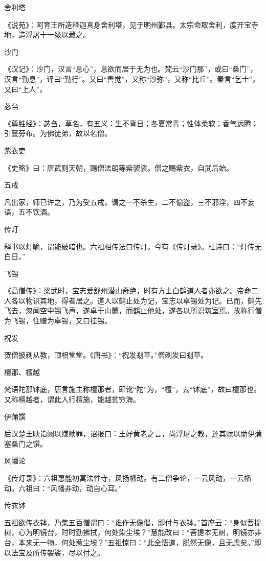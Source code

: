 \documentclass[a4paper,12pt,UTF8,twoside]{ctexbook}
\begin{document}
    舍利塔
    
    《说苑》：阿育王所造释迦真身舍利塔，见于明州鄞县。太宗命取舍利，度开宝寺地，造浮屠十一级以藏之。
    
    沙门
    
    《汉记》：沙门，汉言“息心”，息欲而居于无为也。梵云“沙门那”，或曰“桑门”，汉言“勤息”，译曰“勤行”。又曰“善觉”，又称“沙弥”，又称“比丘”。秦言“乞士”，又曰“上人”。
    
    苾刍
    
    《尊胜经》：苾刍，草名，有五义：生不背日；冬夏常青；性体柔软；香气远腾；引蔓旁布。为佛徒弟，故以名僧。
    
    紫衣吏
    
    《史略》曰：唐武则天朝，赐僧法朗等紫袈裟。僧之赐紫衣，自武后始。
    
    五戒
    
    凡出家，师已许之，乃为受五戒，谓之一不杀生，二不偷盗，三不邪淫，四不妄语，五不饮酒。
    
    传灯
    
    释书以灯喻，谓能破暗也。六祖相传法曰传灯。今有《传灯录》。杜诗曰：“灯传无白日。”
    
    飞锡
    
    《高僧传》：梁武时，宝志爱舒州潜山奇绝，时有方士白鹤道人者亦欲之。帝命二人各以物识其地，得者居之。道人以鹤止处为记，宝志以卓锡处为记。已而，鹤先飞去，忽闻空中锡飞声，遂卓于山麓，而鹤止他处，遂各以所识筑室焉。故称行僧为飞锡，住赠为卓锡，又曰挂锡。
    
    祝发
    
    贺僧披剃从教，顶相堂堂。《唐书》：“祝发刬草。”僧剃发曰刬草。
    
    檀那、檀越
    
    梵语陀那钵底，唐言施主称檀那者，即讹“陀”为，“檀”，去“钵底”，故曰檀那也。又称檀越者，谓此人行檀施，能越贫穷海。
    
    伊蒲馔
    
    后汉楚王映诣阙以缣赎罪，诏报曰：王好黄老之言，尚浮屠之教，还其赎以助伊蒲塞桑门之馔。
    
    风幡论
    
    《传灯录》：六祖惠能初寓法性寺，风扬幡动。有二僧争论，一云风动，一云幡动。六祖曰：“风幡非动，动自心耳。”
    
    传衣钵
    
    五祖欲传衣钵，乃集五百僧谓曰：“谁作无像偈，即付与衣钵。”首座云：“身似菩提树，心为明镜台，时时勤拂拭，何处染尘埃？”慧能改曰：“菩提本无树，明镜亦非台，本来无一物，何处惹尘埃？”五祖惊曰：“此全悟道，脱然无像，且无虑矣。”即以法宝及所传袈裟，尽以付之。
    
\end{document}
